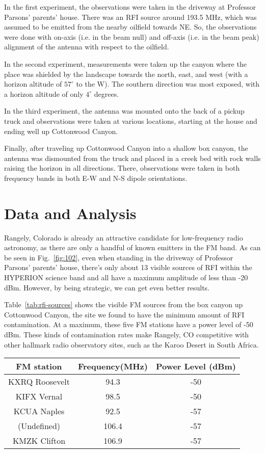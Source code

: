 \documentclass[11pt]{article}
\begin{document}
In the first experiment, the observations were taken in the driveway at 
Professor Parsons' parents' house. There was an RFI source around 193.5 MHz, 
which was assumed to be emitted from the nearby oilfield towards NE. So, the 
observations were done with on-axis (i.e. in the beam null) and off-axis (i.e.  
in the beam peak) alignment of the antenna with respect to the oilfield.

In the second experiment, measurements were taken up the canyon where the
place was shielded by the landscape towards the north, east, and west (with a 
horizon altitude of $57^{\circ}$ to the W). The southern direction was most 
exposed, with a horizon altitude of only $4^{\circ}$ degrees.

In the third experiment, the antenna was mounted onto the back of a pickup 
truck and observations were taken at various locations, starting at the house 
and ending well up Cottonwood Canyon.

Finally, after traveling up Cottonwood Canyon into a shallow box canyon, the 
antenna was dismounted from the truck and placed in a creek bed with rock walls 
raising the horizon in all directions. There, observations were taken in both 
frequency bands in both E-W and N-S dipole orientations.

\section{Data and Analysis}

Rangely, Colorado is already an attractive candidate for low-frequency radio 
astronomy, as there are only a handful of known emitters in the FM band. As can 
be seen in Fig.~\ref{fig:102}, even when standing in the driveway of Professor 
Parsons' parents' house, there's only about 13 visible sources of RFI within 
the HYPERION science band and all have a maximum amplitude of less than -20 
dBm. However, by being strategic, we can get even better results.

Table~\ref{tab:rfi-sources} shows the visible FM sources from the box canyon up 
Cottonwood Canyon, the site we found to have the minimum amount of RFI 
contamination. At a maximum, these five FM stations have a power level of -50 
dBm. These kinds of contamination rates make Rangely, CO competitive with other 
hallmark radio observatory sites, such as the Karoo Desert in South Africa.

\begin{center}
 \begin{tabular}{ |c|c|c| }
  \hline
  FM station & Frequency(MHz) & Power Level (dBm) \\
  \hline
  KXRQ Roosevelt & 94.3  & -50 \\
  \hline
  KIFX Vernal    & 98.5  & -50 \\
  \hline
  KCUA Naples    & 92.5  & -57 \\
  \hline
  (Undefined)    & 106.4 & -57 \\
  \hline
  KMZK Clifton   & 106.9 & -57 \\
  \hline
  \end{tabular}
  \label{tab:rfi-sources}
\end{center}
\end{document}
